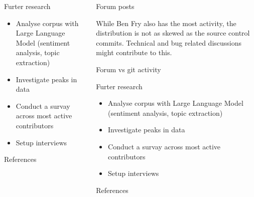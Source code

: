\documentclass[final]{beamer}
\begin{document}
\begin{frame}[t]
\begin{columns}[t]
\begin{column}{.32\textwidth}
      \begin{block}{Furter research}
        \begin{itemize}
          \item Analyse corpus with Large Language Model (sentiment analysis, topic extraction)
          \item Investigate peaks in data
          \item Conduct a survay across most active contributors
          \item Setup interviews 
        \end{itemize}
      \end{block}

      \begin{block}{References}
        \printbibliography
      \end{block}
    \end{column}

    \begin{column}{.32\textwidth}
      \begin{block}{Forum posts}
        
        While Ben Fry also has the most activity, the distribution is not as skewed as the source control commits. Technical and bug related discussions might contribute to this.
      \end{block}
      \begin{block}{Forum vs git activity}
        
        
      \end{block}

      \begin{block}{Furter research}
        \begin{itemize}
          \item Analyse corpus with Large Language Model (sentiment analysis, topic extraction)
          \item Investigate peaks in data
          \item Conduct a survay across most active contributors
          \item Setup interviews 
        \end{itemize}
      \end{block}

      \begin{block}{References}
        \printbibliography
      \end{block}
    \end{column}
    
  \end{columns}
\end{frame}
\end{document}
